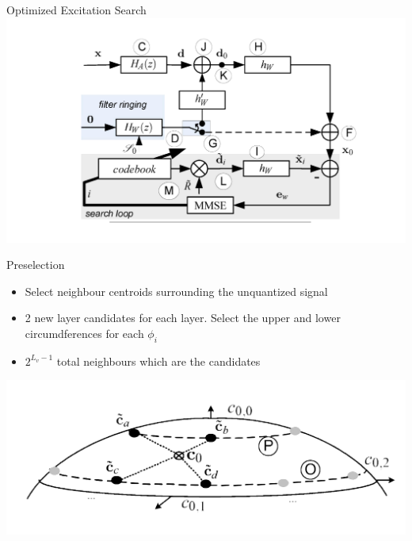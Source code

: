 \documentclass[10pt]{beamer}
\begin{document}
  \begin{frame}{Optimized Excitation Search}
      \includegraphics[width=\linewidth]{./img/closed_loop_scheme_complex.png}


  \end{frame}

  \begin{frame}{Preselection}
    \begin{itemize}
      \item Select neighbour centroids surrounding the unquantized signal
      \item  2 new layer candidates for each layer. Select the upper and lower circumdferences for each $\phi_i$
      \item $2^{L_v -1}$ total neighbours which are the candidates
    \end{itemize}
    \centering
    \includegraphics[width=\linewidth]{./img/optim_search_2.png}
  \end{frame}
\end{document}
